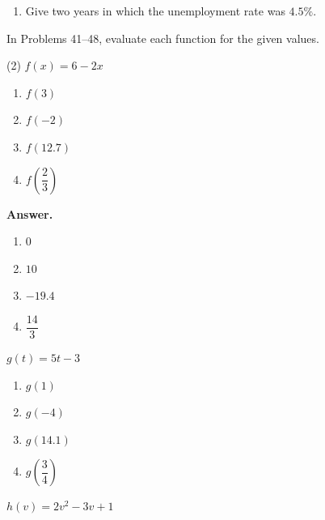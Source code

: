\documentclass[10pt,]{book}
\theoremstyle{plain}
\theoremstyle{definition}
\theoremstyle{definition}
\theoremstyle{definition}
\begin{document}
\begin{exerciselist}
\begin{exercisegroup}
\begin{enumerate}[label=\alph*]
\item\hypertarget{li-146}{}Give two years in which the unemployment rate was \(4.5\%\).%
\end{enumerate}
%
\end{exercisegroup}
\par\smallskip\noindent
\hypertarget{exercisegroup-6}{}\par\noindent In Problems 41–48, evaluate each function for the given values.%
\begin{exercisegroup}(2)
\exercise[41.]\hypertarget{exercise-51}{}\(f (x) = 6 - 2x\) \leavevmode%
\begin{multicols}{2}
\begin{enumerate}[label=\alph*]
\item\hypertarget{li-147}{}\(f(3)\)%
\item\hypertarget{li-148}{}\(f(-2)\)%
\item\hypertarget{li-149}{}\(f(12.7)\)%
\item\hypertarget{li-150}{}\(f\left(\dfrac{2}{3}\right)\)%
\end{enumerate}
\end{multicols}
%
\par\smallskip
\noindent\textbf{Answer.}\hypertarget{answer-31}{}\quad
\leavevmode%
\begin{multicols}{2}
\begin{enumerate}[label=\alph*]
\item\hypertarget{li-151}{}\(0\)%
\item\hypertarget{li-152}{}\(10\)%
\item\hypertarget{li-153}{}\(-19.4\)%
\item\hypertarget{li-154}{}\(\dfrac{14}{3} \)%
\end{enumerate}
\end{multicols}
%
\exercise[42.]\hypertarget{exercise-52}{}\(g(t) = 5t - 3\) \leavevmode%
\begin{multicols}{2}
\begin{enumerate}[label=\alph*]
\item\hypertarget{li-155}{}\(g(1)\)%
\item\hypertarget{li-156}{}\(g(-4)\)%
\item\hypertarget{li-157}{}\(g(14.1)\)%
\item\hypertarget{li-158}{}\(g\left(\dfrac{3}{4}\right)\)%
\end{enumerate}
\end{multicols}
%
\exercise[43.]\hypertarget{exercise-53}{}\(h(v) = 2v^2 - 3v + 1\) \leavevmode%
\begin{multicols}{2}

\end{multicols}
\end{exercisegroup}
\end{exerciselist}
\end{document}
